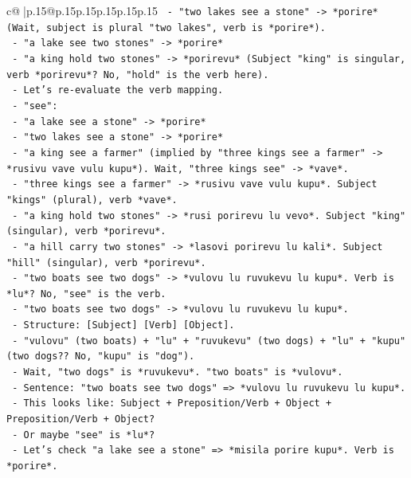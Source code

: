 \documentclass{article}
\begin{document}
{\begin{supertabular}{c@{$\;$}|p{.15\linewidth}@{}p{.15\linewidth}p{.15\linewidth}p{.15\linewidth}p{.15\linewidth}p{.15\linewidth}}
{{{\texttt{    {-} "two lakes see a stone" {-}> *porire* (Wait, subject is plural "two lakes", verb is *porire*).} \\
\texttt{    {-} "a lake see two stones" {-}> *porire*} \\
\texttt{    {-} "a king hold two stones" {-}> *porirevu* (Subject "king" is singular, verb *porirevu*? No, "hold" is the verb here).} \\
\texttt{    {-} Let's re{-}evaluate the verb mapping.} \\
\texttt{    {-} "see":} \\
\texttt{      {-} "a lake see a stone" {-}> *porire*} \\
\texttt{      {-} "two lakes see a stone" {-}> *porire*} \\
\texttt{      {-} "a king see a farmer" (implied by "three kings see a farmer" {-}> *rusivu vave vulu kupu*). Wait, "three kings see" {-}> *vave*.} \\
\texttt{      {-} "three kings see a farmer" {-}> *rusivu vave vulu kupu*. Subject "kings" (plural), verb *vave*.} \\
\texttt{      {-} "a king hold two stones" {-}> *rusi porirevu lu vevo*. Subject "king" (singular), verb *porirevu*.} \\
\texttt{      {-} "a hill carry two stones" {-}> *lasovi porirevu lu kali*. Subject "hill" (singular), verb *porirevu*.} \\
\texttt{      {-} "two boats see two dogs" {-}> *vulovu lu ruvukevu lu kupu*. Verb is *lu*? No, "see" is the verb.} \\
\texttt{        {-} "two boats see two dogs" {-}> *vulovu lu ruvukevu lu kupu*.} \\
\texttt{        {-} Structure: {[}Subject{]} {[}Verb{]} {[}Object{]}.} \\
\texttt{        {-} "vulovu" (two boats) + "lu" + "ruvukevu" (two dogs) + "lu" + "kupu" (two dogs?? No, "kupu" is "dog").} \\
\texttt{        {-} Wait, "two dogs" is *ruvukevu*. "two boats" is *vulovu*.} \\
\texttt{        {-} Sentence: "two boats see two dogs" => *vulovu lu ruvukevu lu kupu*.} \\
\texttt{        {-} This looks like: Subject + Preposition/Verb + Object + Preposition/Verb + Object?} \\
\texttt{        {-} Or maybe "see" is *lu*?} \\
\texttt{        {-} Let's check "a lake see a stone" => *misila porire kupu*. Verb is *porire*.} \\
}}}
\end{supertabular}}
\end{document}
